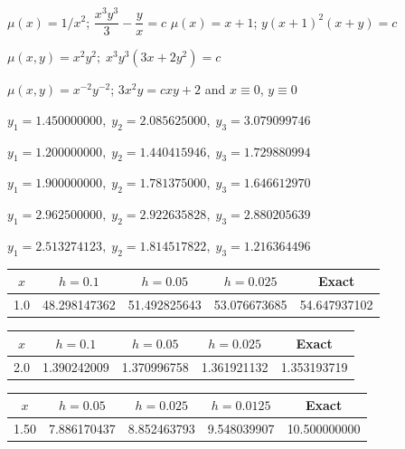  $\mu(x)=1/x^2$;\; $\dfrac{x^3y^3}{3}-\dfrac{y}{x}=c$
 $\mu(x)=x+1$;\; $y(x+1)^2(x+y)=c$

  $\mu(x,y)=x^2y^2;\; x^3y^3(3x+2y^2)=c$

  $\mu(x,y)=x^{-2}y^{-2}$;   $3x^2y=cxy+2$ and $x\equiv0$,
$y\equiv0$
\bigskip



$y_1=1.450000000,\; y_2=2.085625000,\; y_3= 3.079099746$

$y_1=1.200000000,\; y_2=1.440415946,\; y_3=1.729880994$

$y_1=1.900000000,\; y_2=1.781375000,\; y_3=1.646612970$

$y_1=2.962500000,\; y_2=2.922635828,\; y_3=2.880205639$

$y_1=2.513274123,\; y_2=1.814517822,\; y_3=1.216364496$

\medskip

\quad
{\small
{}
\begin{tabular}{|c|r|r|r|r|}\hline
\multicolumn{1}{|c|}{$x$}&
\multicolumn{1}{|c|}{$h=0.1$}&
\multicolumn{1}{|c|}{$h=0.05$}&
\multicolumn{1}{|c|}{$h=0.025$}&
\multicolumn{1}{|c|}{Exact}\\ \hline
1.0 & 48.298147362 &  51.492825643 & 53.076673685 &  54.647937102 \\
\hline
\end{tabular}}

\bigskip

\quad
{\small
{}
\begin{tabular}{|c|r|r|r|r|}\hline
\multicolumn{1}{|c|}{$x$}&
\multicolumn{1}{|c|}{$h=0.1$}&
\multicolumn{1}{|c|}{$h=0.05$}&
\multicolumn{1}{|c|}{$h=0.025$}&
\multicolumn{1}{|c|}{Exact}\\ \hline
2.0 & 1.390242009 & 1.370996758 & 1.361921132 & 1.353193719\\
\hline
\end{tabular}}

\bigskip

 \quad
{\small
{}
\begin{tabular}{|c|r|r|r|r|}\hline
\multicolumn{1}{|c|}{$x$}&
\multicolumn{1}{|c|}{$h=0.05$}&
\multicolumn{1}{|c|}{$h=0.025$}&
\multicolumn{1}{|c|}{$h=0.0125$}&
\multicolumn{1}{|c|}{Exact}\\ \hline
1.50 &  7.886170437 & 8.852463793 & 9.548039907 & 10.500000000 \\
\hline
\end{tabular}}

